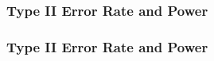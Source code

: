 \documentclass[handout]{beamer}
\newcommand{\blue}[1]{\textcolor{blue2}{#1}}
\begin{document}
\begin{frame}
\frametitle{Type II Error Rate and Power}
%

\end{frame}



\begin{frame}
\frametitle{Type II Error Rate and Power}
%
%

\end{frame}
\end{document}
